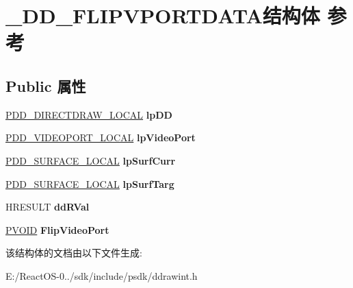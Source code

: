 \hypertarget{struct___d_d___f_l_i_p_v_p_o_r_t_d_a_t_a}{}\section{\+\_\+\+D\+D\+\_\+\+F\+L\+I\+P\+V\+P\+O\+R\+T\+D\+A\+T\+A结构体 参考}
\label{struct___d_d___f_l_i_p_v_p_o_r_t_d_a_t_a}
\subsection*{Public 属性}
\begin{DoxyCompactItemize}
\item 
\mbox{\label{struct___d_d___f_l_i_p_v_p_o_r_t_d_a_t_a_a37fefc833e03743fede9af5995378d2d}} 
\hyperlink{struct___d_d___d_i_r_e_c_t_d_r_a_w___l_o_c_a_l}{P\+D\+D\+\_\+\+D\+I\+R\+E\+C\+T\+D\+R\+A\+W\+\_\+\+L\+O\+C\+AL} {\bfseries lp\+DD}
\item 
\mbox{\label{struct___d_d___f_l_i_p_v_p_o_r_t_d_a_t_a_a9fa17b362d76079edfcc2464dcf4275c}} 
\hyperlink{struct___d_d___v_i_d_e_o_p_o_r_t___l_o_c_a_l}{P\+D\+D\+\_\+\+V\+I\+D\+E\+O\+P\+O\+R\+T\+\_\+\+L\+O\+C\+AL} {\bfseries lp\+Video\+Port}
\item 
\mbox{\label{struct___d_d___f_l_i_p_v_p_o_r_t_d_a_t_a_a6801ab55c9edb29d67ae871b9de4eac5}} 
\hyperlink{struct___d_d___s_u_r_f_a_c_e___l_o_c_a_l}{P\+D\+D\+\_\+\+S\+U\+R\+F\+A\+C\+E\+\_\+\+L\+O\+C\+AL} {\bfseries lp\+Surf\+Curr}
\item 
\mbox{\label{struct___d_d___f_l_i_p_v_p_o_r_t_d_a_t_a_ac6510879c4f74c688a04f3087beecc63}} 
\hyperlink{struct___d_d___s_u_r_f_a_c_e___l_o_c_a_l}{P\+D\+D\+\_\+\+S\+U\+R\+F\+A\+C\+E\+\_\+\+L\+O\+C\+AL} {\bfseries lp\+Surf\+Targ}
\item 
\mbox{\label{struct___d_d___f_l_i_p_v_p_o_r_t_d_a_t_a_a462bdc1a223f93e4eb33090ba75bdd2b}} 
H\+R\+E\+S\+U\+LT {\bfseries dd\+R\+Val}
\item 
\mbox{\label{struct___d_d___f_l_i_p_v_p_o_r_t_d_a_t_a_abc92a66f0a321a06a060a70d4a7487ff}} 
\hyperlink{interfacevoid}{P\+V\+O\+ID} {\bfseries Flip\+Video\+Port}
\end{DoxyCompactItemize}


该结构体的文档由以下文件生成\+:\begin{DoxyCompactItemize}
\item 
E\+:/\+React\+O\+S-\/0../sdk/include/psdk/ddrawint.\+h\end{DoxyCompactItemize}
